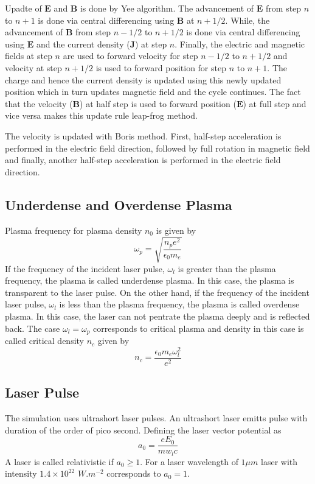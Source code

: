 \documentclass[12pt]{article}
\begin{document}
Upadte of $\mathbf{E}$ and $\mathbf{B}$ is done by Yee algorithm. The advancement of $\mathbf{E}$ from step $n$ to $n+1$ is done via central differencing using $\mathbf{B}$ at $n+1/2$. While, the advancement of $\mathbf{B}$ from step $n-1/2$ to $n+1/2$ is done via central differencing using $\mathbf{E}$ and the current density ($\textbf{J}$) at step $n$. Finally, the electric and magnetic fields at step $n$ are used to forward velocity for step $n-1/2$ to $n+1/2$ and velocity at step $n+1/2$ is used to forward position for step $n$ to $n+1$. The charge and hence the current density is updated using this newly updated position which in turn updates magnetic field and the cycle continues. The fact that the velocity ($\mathbf{B}$) at half step is used to forward position ($\mathbf{E}$) at full step and vice versa makes this update rule leap-frog method.

The velocity is updated with Boris method. First, half-step acceleration is performed in the electric field direction, followed by full rotation in magnetic field and finally, another half-step acceleration is performed in the electric field direction.
\subsection{Underdense and Overdense Plasma}
Plasma frequency for plasma density $n_0$ is given by
\begin{equation*}
    \omega_p = \sqrt{\frac{n_p e^2}{\epsilon_0 m_e}}
\end{equation*}
If the frequency of the incident laser pulse, $\omega_l$ is greater than the plasma frequency, the plasma is called underdense plasma. In this case, the plasma is transparent to the laser pulse. On the other hand, if the frequency of the incident laser pulse, $\omega_l$ is less than the plasma frequency, the plasma is called overdense plasma. In this case, the laser can not pentrate the plasma deeply and is reflected back. The case $\omega_l = \omega_p$ corresponds to critical plasma and density in this case is called critical density $n_c$ given by
\begin{equation*}
    n_c = \frac{\epsilon_0 m_e \omega_l^2}{e^2}
\end{equation*}
\subsection{Laser Pulse}
The simulation uses ultrashort laser pulses. An ultrashort laser emitts pulse with duration of the order of pico second. Defining the laser vector potential as
$$
    a_0 = \frac{eE_0}{m w_l c}
$$
A laser is called relativistic if $a_0 \ge 1$. For a laser wavelength of $1 \mu m$ laser with intensity $1.4 \times10^{22}$  $W.m^{-2}$ corresponds to $a_0=1$.
\end{document}

